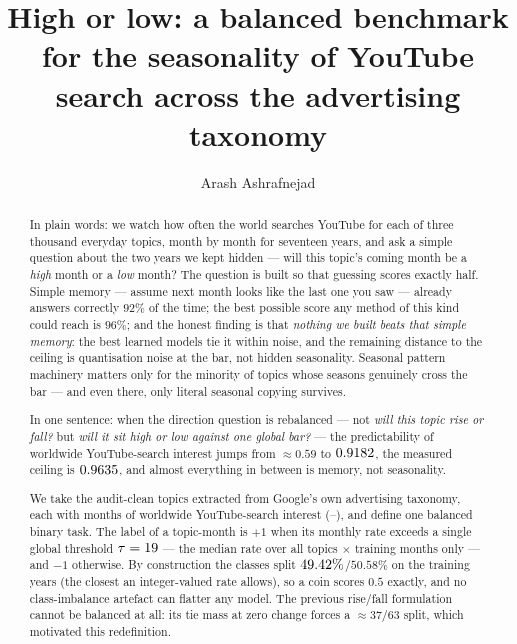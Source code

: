 \documentclass[11pt]{artaquest}
\title{High or low: a balanced benchmark for the seasonality of YouTube search across the advertising taxonomy}
\author{Arash Ashrafnejad\affmark{1}}
\affiliation{\affmark{1}ArtaQuest Foundation}
\begin{document}
\maketitle

\begin{abstract}
In plain words: we watch how often the world searches YouTube for each of three thousand
everyday topics, month by month for seventeen years, and ask a simple question about the two
years we kept hidden --- will this topic's coming month be a \emph{high} month or a \emph{low}
month? The question is built so that guessing scores exactly half. Simple memory --- assume
next month looks like the last one you saw --- already answers correctly $92\%$ of the time;
the best possible score any method of this kind could reach is $96\%$; and the honest finding
is that \emph{nothing we built beats that simple memory}: the best learned models tie it
within noise, and the remaining distance to the ceiling is quantisation noise at the bar, not
hidden seasonality. Seasonal pattern machinery matters only for the minority of topics whose
seasons genuinely cross the bar --- and even there, only literal seasonal copying survives.

In one sentence: when the direction question is rebalanced --- not \emph{will this topic rise or
fall?} but \emph{will it sit high or low against one global bar?} --- the predictability of
worldwide YouTube-search interest jumps from ${\approx}0.59$ to $0.9182$, the measured
ceiling is $0.9635$, and almost everything in between is memory, not seasonality.

We take the \nTopics{} audit-clean topics extracted from Google's own advertising taxonomy,
each with \nMonths{} months of worldwide YouTube-search interest (\winStart{}--\winEnd{}), and
define one balanced binary task. The label of a topic-month is $+1$ when its monthly rate
exceeds a single global threshold $\tau=19$ --- the median rate over all topics $\times$
training months only --- and $-1$ otherwise. By construction the classes split
$49.42\%$/$50.58\%$ on the training years (the closest an integer-valued rate allows),
so a coin scores $0.5$ exactly, and no class-imbalance artefact can flatter any model. The
previous rise/fall formulation cannot be balanced at all: its tie mass at zero change forces a
${\approx}37/63$ split, which motivated this redefinition.


\end{abstract}
\end{document}
